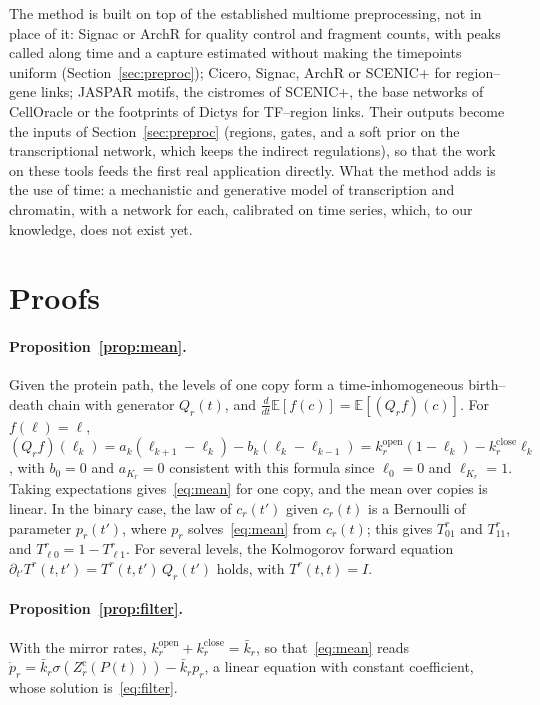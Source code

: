 \documentclass[a4paper, 11pt]{article}
\newcommand{\E}{\mathbb{E}}
\newcommand{\kop}{k^{\mathrm{open}}}
\newcommand{\kcl}{k^{\mathrm{close}}}
\theoremstyle{plain}
\theoremstyle{remark}
\begin{document}
The method is built on top of the established multiome preprocessing, not in place of it: Signac or ArchR for quality control and fragment counts, with peaks called along time and a capture estimated without making the timepoints uniform (Section~\ref{sec:preproc}); Cicero, Signac, ArchR or SCENIC+ for region--gene links; JASPAR motifs, the cistromes of SCENIC+, the base networks of CellOracle or the footprints of Dictys for TF--region links. Their outputs become the inputs of Section~\ref{sec:preproc} (regions, gates, and a soft prior on the transcriptional network, which keeps the indirect regulations), so that the work on these tools feeds the first real application directly. What the method adds is the use of time: a mechanistic and generative model of transcription and chromatin, with a network for each, calibrated on time series, which, to our knowledge, does not exist yet.

\appendix
\section{Proofs}\label{app:proofs}

\paragraph{Proposition~\ref{prop:mean}.} Given the protein path, the levels of one copy form a time-inhomogeneous birth--death chain with generator $Q_r(t)$, and $\frac{d}{dt}\E[f(c)] = \E[(Q_r f)(c)]$. For $f(\ell) = \ell$, $(Q_r f)(\ell_k) = a_k(\ell_{k+1} - \ell_k) - b_k(\ell_k - \ell_{k-1}) = \kop_r(1 - \ell_k) - \kcl_r\ell_k$, with $b_0 = 0$ and $a_{K_r} = 0$ consistent with this formula since $\ell_0 = 0$ and $\ell_{K_r} = 1$. Taking expectations gives~\eqref{eq:mean} for one copy, and the mean over copies is linear. In the binary case, the law of $c_r(t')$ given $c_r(t)$ is a Bernoulli of parameter $p_r(t')$, where $p_r$ solves~\eqref{eq:mean} from $c_r(t)$; this gives $T^r_{01}$ and $T^r_{11}$, and $T^r_{\ell 0} = 1 - T^r_{\ell 1}$. For several levels, the Kolmogorov forward equation $\partial_{t'}T^r(t,t') = T^r(t,t')\,Q_r(t')$ holds, with $T^r(t,t) = I$.

\paragraph{Proposition~\ref{prop:filter}.} With the mirror rates, $\kop_r + \kcl_r = \bar k_r$, so that~\eqref{eq:mean} reads $\dot p_r = \bar k_r\sigma(Z^{\mathrm{c}}_r(P(t))) - \bar k_r p_r$, a linear equation with constant coefficient, whose solution is~\eqref{eq:filter}.
\end{document}
